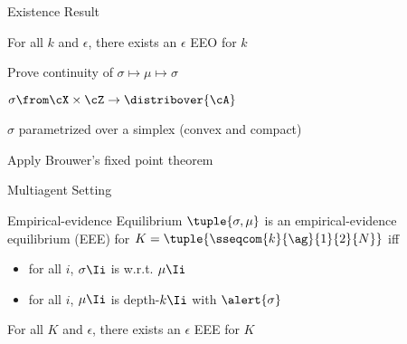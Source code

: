 \begin{frame}{Existence Result}

  For all \(k\) and \(\epsilon\), there exists an \(\epsilon\) EEO for \(k\)

  \bigskip


  Prove continuity of \(\sigma \mapsto \mu \mapsto \sigma\)

  \bigskip
  \(\sigma \from \cX \times \cZ \to \distribover{\cA}\)

  \(\sigma\) parametrized over a simplex (convex and compact)

  \bigskip
  Apply Brouwer's fixed point theorem
\end{frame}
\begin{frame}{Multiagent Setting}
\end{frame}
\begin{frame}{Empirical-evidence Equilibrium}
  \(\tuple{\sigma, \mu}\) is an empirical-evidence equilibrium (EEE) for \(K=\tuple{\sseqcom{k}{\ag}{1}{2}{N}}\) iff
  \begin{itemize}
    \item for all \(i\), \(\sigma\Ii\) is  w.r.t. \(\mu\Ii\)
    \item for all \(i\), \(\mu\Ii\) is depth-\(k\Ii\)  with \(\alert{\sigma}\)
  \end{itemize}

  \bigskip

  For all \(K\) and \(\epsilon\), there exists an \(\epsilon\) EEE for \(K\)
\end{frame}
